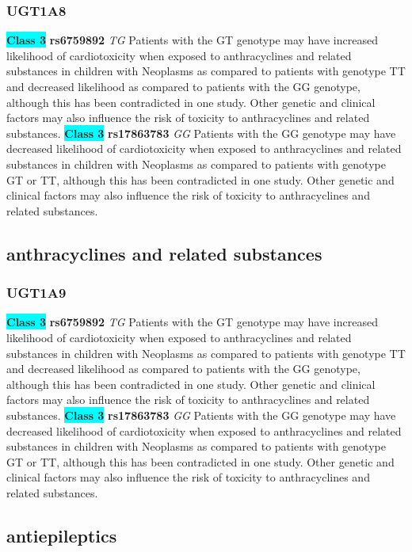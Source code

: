 \documentclass{book}
\begin{document}
\subsubsection{ UGT1A8 }

\begin{center}
\textbf{\colorbox{cyan} {Class 3}} \textbf{ rs6759892 } \textit{ TG }
Patients with the GT genotype may have increased likelihood of cardiotoxicity when exposed to anthracyclines and related substances in children with Neoplasms as compared to patients with genotype TT and decreased likelihood as compared to patients with the GG genotype, although this has been contradicted in one study. Other genetic and clinical factors may also influence the risk of toxicity to anthracyclines and related substances. \textbf{\colorbox{cyan} {Class 3}} \textbf{ rs17863783 } \textit{ GG }
Patients with the GG genotype may have decreased likelihood of cardiotoxicity when exposed to anthracyclines and related substances in children with Neoplasms as compared to patients with genotype GT or TT, although this has been contradicted in one study. Other genetic and clinical factors may also influence the risk of toxicity to anthracyclines and related substances.



\end{center}\subsection{ anthracyclines and related substances }


\subsubsection{ UGT1A9 }

\begin{center}
\textbf{\colorbox{cyan} {Class 3}} \textbf{ rs6759892 } \textit{ TG }
Patients with the GT genotype may have increased likelihood of cardiotoxicity when exposed to anthracyclines and related substances in children with Neoplasms as compared to patients with genotype TT and decreased likelihood as compared to patients with the GG genotype, although this has been contradicted in one study. Other genetic and clinical factors may also influence the risk of toxicity to anthracyclines and related substances. \textbf{\colorbox{cyan} {Class 3}} \textbf{ rs17863783 } \textit{ GG }
Patients with the GG genotype may have decreased likelihood of cardiotoxicity when exposed to anthracyclines and related substances in children with Neoplasms as compared to patients with genotype GT or TT, although this has been contradicted in one study. Other genetic and clinical factors may also influence the risk of toxicity to anthracyclines and related substances.



\end{center}\subsection{ antiepileptics }
\end{document}
